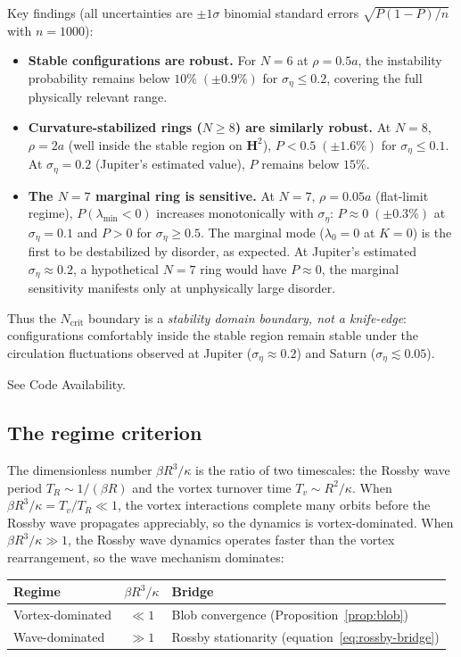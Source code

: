 \medskip\noindent
Key findings (all uncertainties are $\pm 1\sigma$ binomial standard
errors $\sqrt{P(1{-}P)/n}$ with $n = 1000$):
\begin{itemize}
  \item \textbf{Stable configurations are robust.}  For $N = 6$ at
    $\rho = 0.5a$, the instability probability remains
    below $10\%\;(\pm 0.9\%)$ for $\sigma_\eta \le 0.2$, covering
    the full physically relevant range.

  \item \textbf{Curvature-stabilized rings ($N \ge 8$) are similarly
    robust.}  At $N = 8$, $\rho = 2a$ (well inside the stable region
    on $\mathbf{H}^2$), $P < 0.5\;(\pm 1.6\%)$ for
    $\sigma_\eta \le 0.1$.  At $\sigma_\eta = 0.2$ (Jupiter's
    estimated value), $P$ remains below $15\%$.

  \item \textbf{The $N = 7$ marginal ring is sensitive.}  At $N = 7$,
    $\rho = 0.05a$ (flat-limit regime), $P(\lambda_{\min} < 0)$
    increases monotonically with $\sigma_\eta$:
    $P \approx 0\;(\pm 0.3\%)$ at $\sigma_\eta = 0.1$ and $P > 0$ for
    $\sigma_\eta \ge 0.5$.  The marginal mode ($\lambda_0 = 0$ at
    $K = 0$) is the first to be destabilized by disorder, as expected.
    At Jupiter's estimated $\sigma_\eta \approx 0.2$, a hypothetical
    $N = 7$ ring would have $P \approx 0$, the marginal sensitivity
    manifests only at unphysically large disorder.
\end{itemize}

\noindent
Thus the $N_{\mathrm{crit}}$ boundary is a \emph{stability domain
boundary, not a knife-edge}: configurations comfortably inside the
stable region remain stable under the circulation fluctuations
observed at Jupiter ($\sigma_\eta \approx 0.2$) and Saturn
($\sigma_\eta \lesssim 0.05$).

See Code Availability.

\subsection{The regime criterion}

The dimensionless number $\beta R^3/\kappa$ is the ratio of two
timescales: the Rossby wave period $T_R \sim 1/(\beta R)$ and the
vortex turnover time $T_v \sim R^2/\kappa$.  When
$\beta R^3/\kappa = T_v/T_R \ll 1$, the vortex interactions complete
many orbits before the Rossby wave propagates appreciably, so the
dynamics is vortex-dominated.  When $\beta R^3/\kappa \gg 1$, the
Rossby wave dynamics operates faster than the vortex rearrangement,
so the wave mechanism dominates:
\begin{center}
\begin{tabular}{lcl}
\toprule
Regime & $\beta R^3/\kappa$ & Bridge \\
\midrule
Vortex-dominated & $\ll 1$ & Blob convergence (Proposition~\ref{prop:blob}) \\
Wave-dominated & $\gg 1$ & Rossby stationarity (equation~\eqref{eq:rossby-bridge}) \\
\bottomrule
\end{tabular}
\end{center}

